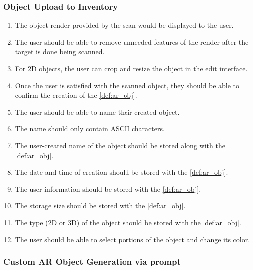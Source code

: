 \documentclass{article}
\begin{document}
\subsubsection{Object Upload to Inventory}
\label{ssub:obj_upload_inv}
\begin{enumerate}[align=left, label=\textbf{OUI-FR\arabic*:}]
    \item The object render provided by the scan would be displayed to the user.
    \item The user should be able to remove unneeded features of the render after the target is done being scanned.
    \item For 2D objects, the user can crop and resize the object in the edit interface.
    \item Once the user is satisfied with the scanned object, they should be able to confirm the creation of the \ref{def:ar_obj}.
    \item The user should be able to name their created object.
    \item The name should only contain ASCII characters.
    \item The user-created name of the object should be stored along with the \ref{def:ar_obj}.
    \item The date and time of creation should be stored with the \ref{def:ar_obj}.
    \item The user information should be stored with the \ref{def:ar_obj}.
    \item The storage size should be stored with the \ref{def:ar_obj}.
    \item The type (2D or 3D) of the object should be stored with the \ref{def:ar_obj}.
    \item The user should be able to select portions of the object and change its color.
\end{enumerate}

\subsubsection{Custom AR Object Generation via prompt}
\label{ssub:prompt_obj_gen}
\end{document}
